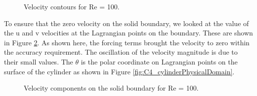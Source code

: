 \begin{figure}[H]
    \centering
    \quad
    \caption{Velocity contours for Re = 100.}
    \label{fig:C4_contourPlotsForFlowOverCylidnerGE}
\end{figure}

To ensure that the zero velocity on the solid boundary, we looked at the value of the u and v velocities at the Lagrangian points on the boundary. These are shown in Figure \ref{fig:C4_fluidVelocityOnCylinder}. As shown here, the forcing terms brought the velocity to zero within the accuracy requirement. The oscillation of the velocity magnitude is due to their small values. The $\theta$ is the polar coordinate on Lagrangian points on the surface of the cylinder as shown in Figure \ref{fig:C4_cylinderPhysicalDomain}.

\begin{figure}[H]
    \centering
    \quad
    \caption{Velocity components on the solid boundary for Re = 100.}
    \label{fig:C4_fluidVelocityOnCylinder}
\end{figure}

